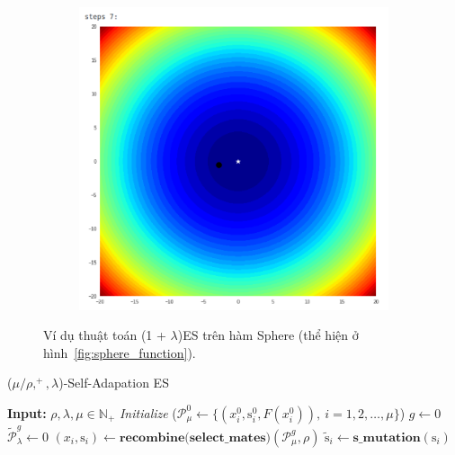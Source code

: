 \documentclass{book}
\begin{document}
\begin{itemize}
\begin{figure}[H]
\begin{figure}[H]
\begin{minipage}[c]{0.45\textwidth}
            \end{minipage}
            \begin{minipage}[c]{0.45\textwidth}
                \centering
                \includegraphics[width=\textwidth]{images/one_plus_lambda_ex_step_7.png}
            \end{minipage}
        \end{figure}
        \caption{Ví dụ thuật toán (1 + $\lambda$)ES trên hàm Sphere (thể hiện ở hình~\ref{fig:sphere_function}).}
        \label{fig:one_plus_lambda_ex}
    \end{figure}
    \begin{algorithm}[]
        \caption{($\mu/\rho,^{+},\lambda$)-Self-Adapation ES}
        \label{alg:mu_rho_lambda_es}
        \begin{algorithmic}[1]
            \STATE \textbf{Input:} $\rho, \lambda, \mu \in \mathbb{N}_{+}$
            \STATE \textit{Initialize} ($\mathcal{P}_{\mu}^{0}\gets \{(x_i^0,\text{s}_i^{0}, F(x_i^0)), \ i=1,2,\dots,\mu\}$)
            \STATE $g \gets 0$
                \STATE $\tilde{\mathcal{P}}_{\lambda}^{g}\gets 0$
                    \STATE $(x_i,\text{s}_i)\gets \textbf{recombine(select\_mates)}(\mathcal{P}_{\mu}^{g},\rho)$
                    \STATE $\tilde{\text{s}}_i\gets \textbf{s\_mutation}(\text{s}_i)$

\end{algorithmic}
\end{algorithm}
\end{itemize}
\end{document}
